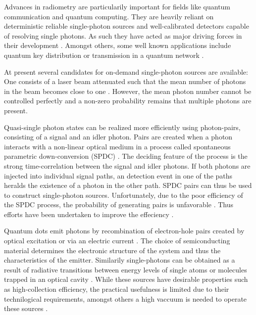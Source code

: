 		Advances in radiometry are particularily important for fields like quantum communication and quantum computing. They are heavily reliant on deterministic reliable single-photon sources and well-calibrated detectors capable of resolving single photons. As such they have acted as major driving forces in their development \cite{vaigu2017::1, vaigu2017::2}. Amongst others, some well known applications include quantum key distribution \cite{janine::12, janine::28, janine::29} or transmission in a quantum network \cite{janine::18, janine::51, janine::54}.

		At present several candidates for on-demand single-photon sources are available: One consists of a laser beam attenuated such that the mean number of photons in the beam becomes close to one \cite{Vaigu2017::6, Vaigu2017::7, Vaigu2017::8}. However, the mean photon number cannot be controlled perfectly and a non-zero probability remains that multiple photons are present.

		Quasi-single photon states can be realized more efficiently using photon-pairs, consisting of a signal and an idler photon. Pairs are created when a photon interacts with a non-linear optical medium in a process called spontaneous parametric down-conversion (SPDC) \cite{Shih, Yanhua (2003). Entangled biphoton source - property and preparation, Vaigu2017::9, Vaigu2017::10, Vaigu2017::11, Vaigu2017::12}. The deciding feature of the process is the strong time-correlation between the signal and idler photons. If both photons are injected into individual signal paths, an detection event in one of the paths heralds the existence of a photon in the other path. SPDC pairs can thus be used to construct single-photon sources. Unfortunately, due to the poor efficiency of the SPDC process, the probability of generating pairs is unfavorable \cite{zwinckels::paper, Bock2016}. Thus efforts have been undertaken to improve the effeciency \cite{Bock2016, zwinckels::112, zwinckels::113}.

		Quantum dots emit photons by recombination of electron-hole pairs created by optical excitation or via an electric current \cite{zwinckels::115, Vaigu2017::18, Vaigu2017::15}. The choice of semiconducting material determines the electronic structure of the system and thus the characteristics of the emitter. Similarily single-photons can be obtained as a result of radiative transitions between energy levels of single atoms or molecules trapped in an optical cavity \cite{zwickels::116}. While these sources have desirable properties such as high-collection efficiency, the practical usefulness is limited due to their technilogical requirements, amongst others a high vaccuum is needed to operate these sources \cite{zwickels::paper}.

